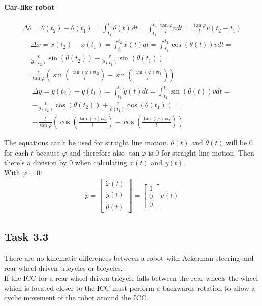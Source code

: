 \documentclass{article}
\begin{document}
	\paragraph{Car-like robot}
	\begin{gather}
	\Delta \theta = \theta(t_{2}) - \theta(t_{1}) = \int_{t_{1}}^{t_{2}} \dot{\theta}(t) dt = \int_{t_{1}}^{t_{2}} \frac{\tan \varphi}{l} v dt = \frac{\tan \varphi}{l} v (t_{2} - t_{1})
	\end{gather}
	\begin{gather}
	\nonumber \Delta x = x(t_{2}) - x(t_{1}) = \int_{t_{1}}^{t_{2}} \dot{x}(t) dt = \int_{t_{1}}^{t_{2}} \cos(\theta(t)) v dt =\\
	\nonumber \frac{v}{\dot{\theta}(t_{2})} \sin(\theta(t_{2})) - \frac{v}{\dot{\theta}(t_{1})} \sin(\theta(t_{1})) =\\
	\frac{l}{\tan \varphi}(\sin(\frac{\tan(\varphi)vt_{2}}{l}) - \sin(\frac{\tan(\varphi)vt_{1}}{l}))
	\end{gather}
	\begin{gather}
	\nonumber \Delta y = y(t_{2}) - y(t_{1}) = \int_{t_{1}}^{t_{2}} \dot{y}(t) dt = \int_{t_{1}}^{t_{2}} \sin(\theta(t)) v dt =\\
	\nonumber -\frac{v}{\dot{\theta}(t_{2})} \cos(\theta(t_{2})) + \frac{v}{\dot{\theta}(t_{1})} \cos(\theta(t_{1})) =\\
	-\frac{l}{\tan \varphi}(\cos(\frac{\tan(\varphi)vt_{2}}{l}) - \cos(\frac{\tan(\varphi)vt_{1}}{l}))
	\end{gather}
	
	The equations can't be used for straight line motion. $\theta(t)$ and $\dot{\theta}(t)$ will be 0 for each $t$ because $\varphi$ and therefore also $\tan \varphi$ is 0 for straight line motion. Then there's a division by 0 when calculating $x(t)$ and $y(t)$.\\
	
	With $\varphi = 0$:
	\begin{gather}
	\dot{p} = 
	\begin{bmatrix}
	\dot{x}(t)\\
	\dot{y}(t)\\
	\dot{\theta}(t)
	\end{bmatrix} = 
	\begin{bmatrix}
	1\\
	0\\
	0
	\end{bmatrix} v(t)
	\end{gather}
	
	\subsection{Task 3.3}
	There are no kinematic differences between a robot with Ackerman steering and rear wheel driven tricycles or bicycles.\\
	If the ICC for a rear wheel driven tricycle falls between the rear wheels the wheel which is located closer to the ICC must perform a backwards rotation to allow a cyclic movement of the robot around the ICC.
\end{document}
